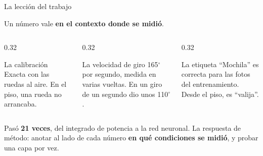 \documentclass[aspectratio=169,11pt]{beamer}
\newcommand{\grad}{\ensuremath{^\circ}}
\begin{document}
\begin{frame}{La lección del trabajo}
  \begin{alertblock}{}
    \centering\large
    Un número vale \textbf{en el contexto donde se midió}.
  \end{alertblock}

  \vspace{0.5em}
  \begin{columns}[T,onlytextwidth]
    \begin{column}{0.32\textwidth}
      \begin{block}{La calibración}
        \small Exacta con las ruedas al aire. En el piso, una rueda no
        arrancaba.
      \end{block}
    \end{column}
    \begin{column}{0.32\textwidth}
      \begin{block}{La velocidad de giro}
        \small 165\grad{} por segundo, medida en varias vueltas. En un giro de
        un segundo dio unos 110\grad.
      \end{block}
    \end{column}
    \begin{column}{0.32\textwidth}
      \begin{block}{La etiqueta}
        \small ``Mochila'' es correcta para las fotos del entrenamiento. Desde
        el piso, es ``valija''.
      \end{block}
    \end{column}
  \end{columns}

  \vspace{0.6em}
  \small
  Pasó \textbf{21 veces}, del integrado de potencia a la red neuronal. La
  respuesta de método: anotar al lado de cada número \textbf{en qué
  condiciones se midió}, y probar una capa por vez.
\end{frame}
\end{document}
